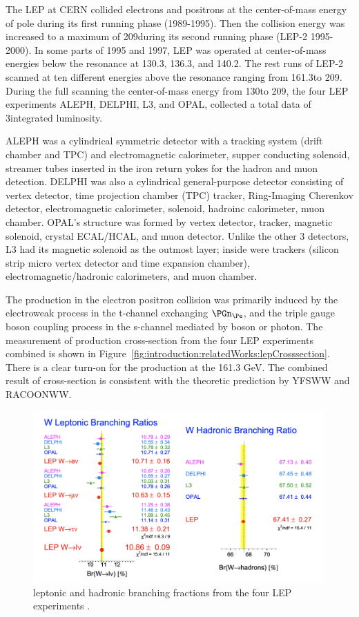 The LEP at CERN collided electrons and positrons at the center-of-mass energy of \PZ pole during its first running phase (1989-1995). Then the collision energy was increased to a maximum of 209\GeV during its second running phase (LEP-2 1995-2000). In some parts of 1995 and 1997, LEP was operated at center-of-mass energies below the \WW resonance at 130.3\GeV, 136.3\GeV, and 140.2\GeV. The rest runs of LEP-2 scanned at ten different energies above the \WW resonance ranging from 161.3\GeV to 209\GeV. During the full scanning the center-of-mass energy from 130\GeV to 209\GeV, the four LEP experiments ALEPH, DELPHI, L3, and OPAL, collected a total data of 3\fbinv integrated luminosity. 

ALEPH was a cylindrical symmetric detector with a tracking system  (drift chamber and TPC) and electromagnetic calorimeter, supper conducting solenoid, streamer tubes inserted in the iron return yokes for the hadron and muon detection. DELPHI was also a cylindrical general-purpose detector consisting of vertex detector, time projection chamber (TPC) tracker, Ring-Imaging Cherenkov detector, electromagnetic calorimeter, solenoid, hadroinc calorimeter, muon chamber. OPAL's structure was formed by vertex detector, tracker, magnetic solenoid, crystal ECAL/HCAL, and muon detector. Unlike the other 3 detectors, L3 had its magnetic solenoid as the outmost layer; inside were trackers (silicon strip micro vertex detector and time expansion chamber), electromagnetic/hadronic calorimeters, and muon chamber. 

The \WW production in the electron positron collision was primarily induced by the electroweak process in the t-channel exchanging $\PGn_\Pe$, and the triple gauge boson coupling process in the s-channel mediated by \PZ boson or photon. The measurement of \WW production cross-section from the four LEP experiments combined is shown in Figure~\ref{fig:introduction:relatedWorks:lepCrosssection}. There is a clear turn-on for the \WW production at the 161.3 GeV. The combined result of \WW cross-section is consistent with the theoretic prediction by YFSWW and RACOONWW.


\begin{figure}[ht]
    \centering
    \includegraphics[width=0.99\textwidth]{chapters/Introduction/sectionRelatedWorks/figures/lep.png}
    \caption{\PW leptonic and hadronic branching fractions from the four LEP experiments \cite{Schael:2013ita}. }
    \label{fig:introduction:relatedWorks:lep}
\end{figure}


